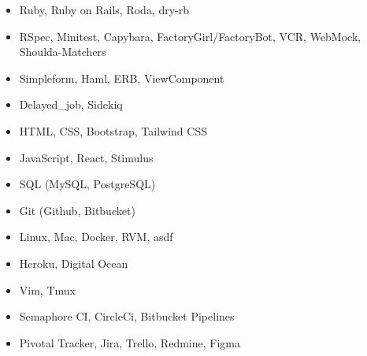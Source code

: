 \documentclass[11pt,a4paper,sans,colorlinks]{moderncv} %
\begin{document}
\begin{multicols}{2}
  \begin{itemize}
    \item Ruby, Ruby on Rails, Roda, dry-rb
    \item RSpec, Minitest, Capybara, FactoryGirl/FactoryBot, VCR, WebMock, Shoulda-Matchers
    \item Simpleform, Haml, ERB, ViewComponent
    \item Delayed\_job, Sidekiq
    \item HTML, CSS, Bootstrap, Tailwind CSS
    \item JavaScript, React, Stimulus
    \item SQL (MySQL, PostgreSQL)
    \item Git (Github, Bitbucket)
    \item Linux, Mac, Docker, RVM, asdf
    \item Heroku, Digital Ocean
    \item Vim, Tmux
    \item Semaphore CI, CircleCi, Bitbucket Pipelines
    \item Pivotal Tracker, Jira, Trello, Redmine, Figma
  \end{itemize}
\end{multicols}
\end{document}
